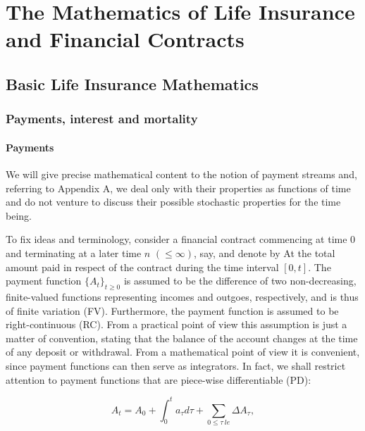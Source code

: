 \documentclass[a4paper,12pt,openany]{book}
\begin{document}
\hypertarget{part-the-mathematics-of-life-insurance-and-financial-contracts}{%
\part{The Mathematics of Life Insurance and Financial Contracts}\label{part-the-mathematics-of-life-insurance-and-financial-contracts}}

\hypertarget{basic-life-insurance-mathematics}{%
\chapter{Basic Life Insurance Mathematics}\label{basic-life-insurance-mathematics}}

\hypertarget{payments-interest-and-mortality}{%
\section{Payments, interest and mortality}\label{payments-interest-and-mortality}}

\hypertarget{payments}{%
\subsection{Payments}\label{payments}}

We will give precise mathematical content to the notion of payment streams and, referring to Appendix A, we deal only with their properties as functions of time and do not venture to discuss their possible stochastic properties for the time being.

To fix ideas and terminology, consider a financial contract commencing at time 0 and terminating at a later time \(n\) \((\le \infty)\), say, and denote by At the total amount paid in respect of the contract during the time interval \([0, t]\). The payment function \(\{A_t\}_{t\ge 0}\) is assumed to be the difference of two non-decreasing, finite-valued functions representing incomes and outgoes, respectively, and is thus of finite variation (FV). Furthermore, the payment function is assumed to be right-continuous (RC). From a practical point of view this assumption is just a matter of convention, stating that the balance of the account changes at the time of any deposit or withdrawal. From a mathematical point of view it is convenient, since payment functions can then serve as integrators. In fact, we shall restrict attention to payment functions that are piece-wise differentiable (PD):

\[
A_t=A_0+\int_0^ta_\tau d\tau+\sum_{0\le \tau\ le}\Delta A_\tau,\tag{1}
\]
\end{document}
